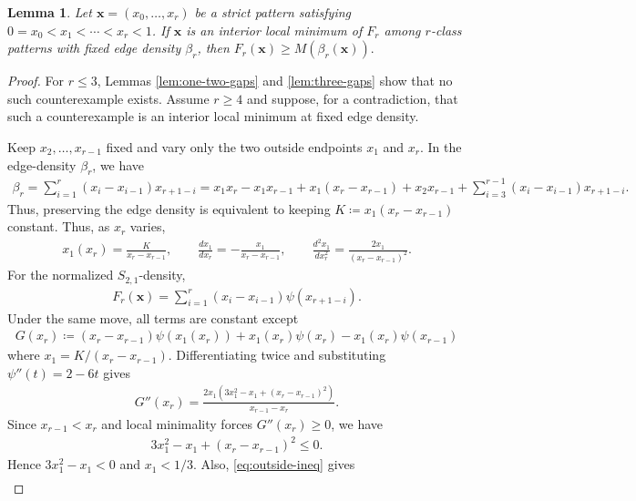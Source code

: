 \documentclass[10pt,a4paper]{article}
\newtheorem{lemma}[definition]{Lemma}
\begin{document}
\begin{lemma}\label{lem:no-interior-xrless1}
Let $\mathbf{x}=(x_0,\ldots,x_r)$ be a strict pattern satisfying $0=x_0<x_1<\cdots<x_r<1$.  If $\mathbf{x}$ is an interior local minimum of $F_r$ among $r$-class patterns with fixed edge density $\beta_r$, then
$
  F_r(\mathbf{x})\ge M(\beta_r(\mathbf{x})).
$
\end{lemma}

\begin{proof}
For $r\le3$, Lemmas \ref{lem:one-two-gaps} and \ref{lem:three-gaps} show that no such counterexample exists.  Assume $r\ge4$ and suppose, for a contradiction, that such a counterexample is an interior local minimum at fixed edge density.

Keep $x_2,\ldots,x_{r-1}$ fixed and vary only the two outside endpoints $x_1$ and $x_r$.  In the edge-density $\beta_r$, we have
\begin{align*}
  \beta_r=\sum_{i=1}^{r}(x_i-x_{i-1})x_{r+1-i}=x_1x_r-x_1x_{r-1}+x_1(x_r-x_{r-1})+x_2x_{r-1}+\sum_{i=3}^{r-1}(x_i-x_{i-1})x_{r+1-i}.
\end{align*}
Thus, preserving the edge density is equivalent to keeping
$
  K\coloneqq x_1(x_r-x_{r-1})
$
constant.  Thus, as $x_r$ varies,
\begin{align}\label{eq:x1-derivs}
  x_1(x_r)=\frac{K}{x_r-x_{r-1}},
  \qquad
  \frac{dx_1}{dx_r}=-\frac{x_1}{x_r-x_{r-1}},
  \qquad
  \frac{d^2x_1}{dx_r^2}=\frac{2x_1}{(x_r-x_{r-1})^2}.
\end{align}
For the normalized $S_{2,1}$-density,
\begin{align*}
  F_r(\mathbf{x})=\sum_{i=1}^r (x_i-x_{i-1})\psi(x_{r+1-i}).
\end{align*}
Under the same move, all terms are constant except
\begin{align*}
  G(x_r)\coloneqq(x_r-x_{r-1})\psi(x_1(x_r))+x_1(x_r)\psi(x_r)-x_1(x_r)\psi(x_{r-1})
\end{align*}
where $x_1=K/(x_r-x_{r-1})$.  Differentiating twice and substituting
$\psi''(t)=2-6t$ gives
\begin{align}\label{eq:G-second}
  G''(x_r)=\frac{2x_1(3x_1^2-x_1+(x_r-x_{r-1})^2)}{x_{r-1}-x_r}.
\end{align}
Since $x_{r-1}<x_r$ and local minimality forces $G''(x_r)\ge0$, we have
\begin{align}\label{eq:outside-ineq}
  3x_1^2-x_1+(x_r-x_{r-1})^2\le0.
\end{align}
Hence $3x_1^2-x_1<0$ and $x_1<1/3$.  Also, \eqref{eq:outside-ineq} gives
\begin{align*}

\end{align*}
\end{proof}
\end{document}
